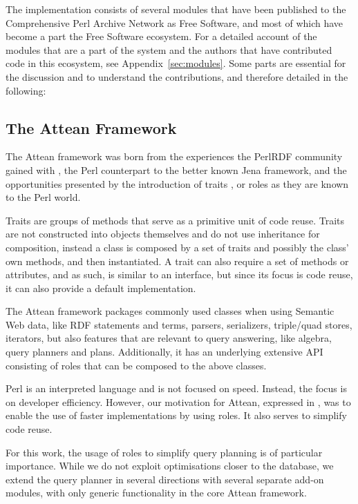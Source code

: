 The implementation consists of several modules that have been
published to the Comprehensive Perl Archive Network as Free Software,
and most of which have become a part the Free Software ecosystem. For
a detailed account of the modules that are a part of the system and
the authors that have contributed code in this ecosystem, see
Appendix~\ref{sec:modules}. Some parts are essential for the
discussion and to understand the contributions, and therefore detailed
in the following:

\subsection{The Attean Framework}\label{sec:attean}

The Attean framework was born from the experiences the PerlRDF
community gained with , the Perl counterpart to
the better known Jena framework, and the opportunities presented by
the introduction of traits \cite{traits}, or roles as they are known
to the Perl world.

Traits are groups of methods that serve as a primitive unit of code
reuse. Traits are not constructed into objects themselves and do not
use inheritance for composition, instead a class is composed by a set
of traits and possibly the class' own methods, and then
instantiated. A trait can also require a set of methods or attributes,
and as such, is similar to an interface, but since its focus is code
reuse, it can also provide a default implementation.

The Attean framework packages commonly used classes when using
Semantic Web data, like RDF statements and terms, parsers,
serializers, triple/quad stores, iterators, but also features that are
relevant to query answering, like algebra, query planners and
plans. Additionally, it has an underlying extensive API consisting of
roles that can be composed to the above classes.

Perl is an interpreted language and is not focused on speed. Instead,
the focus is on developer efficiency. However, our motivation for
Attean, expressed in \cite{williamspushing}, was to enable the use
of faster implementations by using roles. It also serves to simplify 
code reuse.

For this work, the usage of roles to simplify query planning is of
particular importance. While we do not exploit optimisations closer to
the database, we extend the query planner in several directions with
several separate add-on modules, with only generic functionality in
the core Attean framework.

